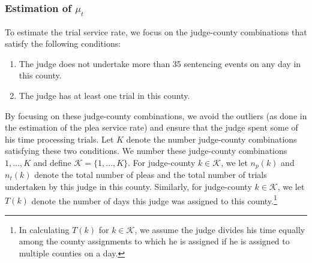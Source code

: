 \documentclass[11pt, oneside]{article}   	%
\theoremstyle{ModifiedStyle}
\begin{document}
\subsubsection{Estimation of $\mu_t$}
To estimate the trial service rate, we focus on the judge-county combinations that satisfy the following conditions:
\begin{enumerate}[label=(\roman*)]
	\vspace{-2mm}
	\item The judge does not undertake more than 35 sentencing events on any day in this county.
	\item The judge has at least one trial in this county.
\end{enumerate}
\vspace{-1mm}
By focusing on these judge-county combinations, we avoid the outliers (as done in the estimation of the plea service rate) and ensure that the judge spent some of his time processing trials. Let $K$ denote the number judge-county combinations satisfying these two conditions. We number these judge-county combinations $1,\ldots,K$ and define $\mathcal{K} = \{1,\ldots,K\}$. For judge-county $k \in \mathcal{K}$, we let $n_p(k)$ and $n_t(k)$ denote the total number of pleas and the total number of trials undertaken by this judge in this county. Similarly, for judge-county $k \in \mathcal{K}$, we let $T(k)$ denote the number of days this judge was assigned to this county.\footnote{In calculating $T(k)$ for $k\in\mathcal{K}$, we assume the judge divides his time equally among the county assignments to which he is assigned if he is assigned to multiple counties on a day.}
\end{document}
